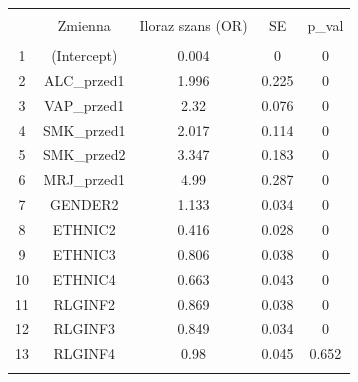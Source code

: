 
\begin{tabular}{@{\extracolsep{5pt}} ccccc} 
\\[-1.8ex]\hline 
\hline \\[-1.8ex] 
 & Zmienna & Iloraz szans (OR) & SE & p\_val \\ 
\hline \\[-1.8ex] 
1 & (Intercept) & 0.004 & 0 & 0 \\ 
2 & ALC\_przed1 & 1.996 & 0.225 & 0 \\ 
3 & VAP\_przed1 & 2.32 & 0.076 & 0 \\ 
4 & SMK\_przed1 & 2.017 & 0.114 & 0 \\ 
5 & SMK\_przed2 & 3.347 & 0.183 & 0 \\ 
6 & MRJ\_przed1 & 4.99 & 0.287 & 0 \\ 
7 & GENDER2 & 1.133 & 0.034 & 0 \\ 
8 & ETHNIC2 & 0.416 & 0.028 & 0 \\ 
9 & ETHNIC3 & 0.806 & 0.038 & 0 \\ 
10 & ETHNIC4 & 0.663 & 0.043 & 0 \\ 
11 & RLGINF2 & 0.869 & 0.038 & 0 \\ 
12 & RLGINF3 & 0.849 & 0.034 & 0 \\ 
13 & RLGINF4 & 0.98 & 0.045 & 0.652 \\ 
\hline \\[-1.8ex] 
\end{tabular} 
